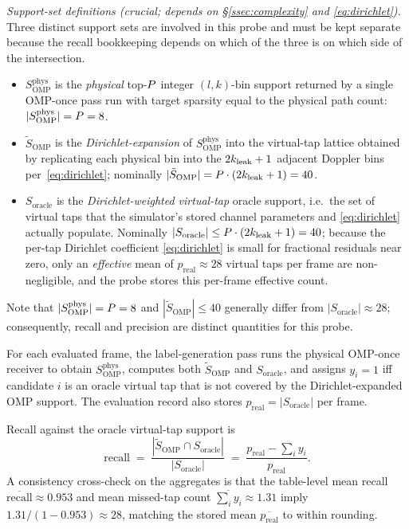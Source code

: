 \emph{Support-set definitions (crucial; depends on \S\ref{ssec:complexity} and \eqref{eq:dirichlet}).}
Three distinct support sets are involved in this probe and must be kept separate because the recall bookkeeping depends on which of the three is on which side of the intersection.
\begin{itemize}[leftmargin=*,itemsep=0pt,topsep=1pt]
\item $S_{\text{OMP}}^{\text{phys}}$ is the \emph{physical} top-$P$ integer $(l, k)$-bin support returned by a single OMP-once pass run with target sparsity equal to the physical path count: $|S_{\text{OMP}}^{\text{phys}}| = P = 8$.
\item $\tilde{S}_{\text{OMP}}$ is the \emph{Dirichlet-expansion} of $S_{\text{OMP}}^{\text{phys}}$ into the virtual-tap lattice obtained by replicating each physical bin into the $2k_{\mathrm{leak}} + 1$ adjacent Doppler bins per~\eqref{eq:dirichlet}; nominally $|\tilde{S}_{\text{OMP}}| = P \cdot (2k_{\mathrm{leak}} + 1) = 40$.
\item $S_{\text{oracle}}$ is the \emph{Dirichlet-weighted virtual-tap} oracle support, i.e.\ the set of virtual taps that the simulator's stored channel parameters and \eqref{eq:dirichlet} actually populate. Nominally $|S_{\text{oracle}}| \leq P \cdot (2k_{\mathrm{leak}} + 1) = 40$; because the per-tap Dirichlet coefficient \eqref{eq:dirichlet} is small for fractional residuals near zero, only an \emph{effective} mean of $p_{\text{real}} \approx 28$ virtual taps per frame are non-negligible, and the probe stores this per-frame effective count.
\end{itemize}
Note that $|S_{\text{OMP}}^{\text{phys}}| = P = 8$ and
$|\tilde{S}_{\text{OMP}}| \leq 40$ generally differ from
$|S_{\text{oracle}}| \approx 28$; consequently, recall and precision
are distinct quantities for this probe.

For each evaluated frame, the label-generation pass runs the physical
OMP-once receiver to obtain $S_{\text{OMP}}^{\text{phys}}$, computes both
$\tilde{S}_{\text{OMP}}$ and $S_{\text{oracle}}$, and assigns $y_i = 1$
iff candidate $i$ is an oracle virtual tap that is not covered by the
Dirichlet-expanded OMP support. The evaluation record also stores
$p_{\text{real}} = |S_{\text{oracle}}|$ per frame.

Recall against the oracle virtual-tap support is
\begin{equation*}
\text{recall} \;=\; \frac{|\tilde{S}_{\text{OMP}} \cap S_{\text{oracle}}|}{|S_{\text{oracle}}|} \;=\; \frac{p_{\text{real}} - \sum_i y_i}{p_{\text{real}}}.
\end{equation*}
A consistency cross-check on the aggregates is that the table-level mean
recall $\overline{\text{recall}} \approx 0.953$ and mean missed-tap count
$\overline{\sum_i y_i} \approx 1.31$ imply
$1.31/(1 - 0.953) \approx 28$, matching the stored mean
$\overline{p_{\text{real}}}$ to within rounding.

